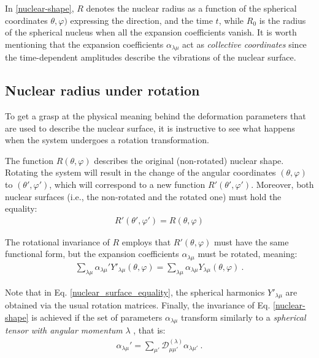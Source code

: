 In \ref{nuclear-shape}, $R$ denotes the nuclear radius as a function of the spherical coordinates $\theta,\varphi)$ expressing the direction, and the time $t$, while $R_0$ is the radius of the spherical nucleus when all the expansion coefficients vanish. It is worth mentioning that the expansion coefficients $\alpha_{\lambda\mu}$ act as \emph{collective coordinates} since the time-dependent amplitudes describe the vibrations of the nuclear surface.

\subsection{Nuclear radius under rotation}

To get a grasp at the physical meaning behind the deformation parameters that are used to describe the nuclear surface, it is instructive to see what happens when the system undergoes a rotation transformation.

The function $R(\theta,\varphi)$ describes the original (non-rotated) nuclear shape. Rotating the system will result in the change of the angular coordinates $(\theta,\varphi)$ to $(\theta',\varphi')$, which will correspond to a new function $R'(\theta',\varphi')$. Moreover, both nuclear surfaces (i.e., the non-rotated and the rotated one) must hold the equality:
\begin{align}
    R'(\theta',\varphi')=R(\theta,\varphi)
\end{align}

The rotational invariance of $R$ employs that $R'(\theta,\varphi)$ must have the same functional form, but the expansion coefficients $\alpha_{\lambda\mu}$ must be rotated, meaning:
\begin{align}
    \sum_{\lambda\mu}\alpha_{\lambda\mu}'Y'_{\lambda\mu}(
        \theta,\varphi)=\sum_{\lambda\mu}\alpha_{\lambda\mu}Y_{\lambda\mu}(
            \theta,\varphi)\ . \label{nuclear_surface_equality}
\end{align}

Note that in Eq. \ref{nuclear_surface_equality}, the spherical harmonics $Y'_{\lambda\mu}$ are obtained via the usual rotation matrices. Finally, the invariance of Eq. \ref{nuclear-shape} is achieved if the set of parameters $\alpha_{\lambda\mu}$ transform similarly to a \emph{spherical tensor with angular momentum} $\lambda$ \cite{ring2004nuclear}, that is:
\begin{align}
    \alpha_{\lambda\mu}'=\sum_{\mu'}\mathcal{D}^{(\lambda)}_{\mu\mu'}\alpha_{\lambda\mu'}\ .
\end{align}

